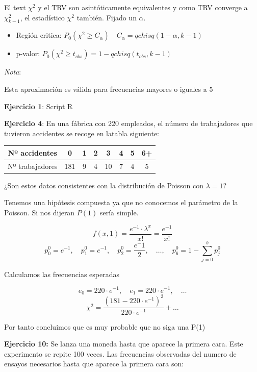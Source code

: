 El text $\chi^2$ y el TRV son asintóticamente equivalentes y como TRV converge a $\chi^2_{k-1}$, el estadístico $\chi^2$ también.
Fijado un $\alpha$.
\begin{itemize}
    \item Región critica: $P_0(\chi^2 \geq C_\alpha) \quad C_\alpha=qchisq(1-\alpha,k-1)$
    \item p-valor: $P_0(\chi^2 \geq t_{obs})=1-qchisq(t_{obs},k-1)$
\end{itemize}

\noindent \textit{Nota}:

Esta aproximación es válida para frecuencias mayores o iguales a 5

\vspace{5mm}

\textbf{Ejercicio 1}: Script R

\vspace{5mm}

\textbf{Ejercicio 4}: En una fábrica con 220 empleados, el número de trabajadores que tuvieron accidentes se recoge en latabla siguiente:

\begin{table}[!h]
    \centering
    \begin{tabular}{|c|c|c|c|c|c|c|c|}
        \hline
        {Nº accidentes} & 0 & 1 & 2 & 3 & 4 & 5 & 6+ \\ \hline
        {Nº trabajadores} & 181 & 9 & 4 & 10 & 7 & 4 & 5 \\ \hline
    \end{tabular}
\end{table}

¿Son estos datos consistentes con la distribución de Poisson con $\lambda=1$?

Tenemos una hipótesis compuesta ya que no conocemos el parámetro de la Poisson.
Si nos dijeran $P(1)$ sería simple.

\[
    f(x,1)=\frac{e^{-1}\cdot \lambda^x}{x!}=\frac{e^{-1}}{x!}
\]
\[
    p_0^0=e^{-1} ,\quad p_1^0=e^{-1} ,\quad p_2^0=\frac{e^-1}{2} ,\quad \dots,\quad p_6^0=1-\sum_{j=0}^{b}p_j^0
\]

Calculamos las frecuencias esperadas

\[
    e_0=220 \cdot e^{-1},\quad e_1=220 \cdot e^{-1}, \quad \dots
\]
\[
    \chi^2=\frac{(181-220 \cdot e^{-1})^2}{220 \cdot e^{-1}}+\dots
\]

Por tanto concluimos que es muy probable que no siga una P(1)

\textbf{Ejercicio 10:} Se lanza una moneda hasta que aparece la primera cara. Este experimento se repite 100 veces. Las frecuencias observadas del numero de ensayos necesarios hasta que aparece la primera cara son:

